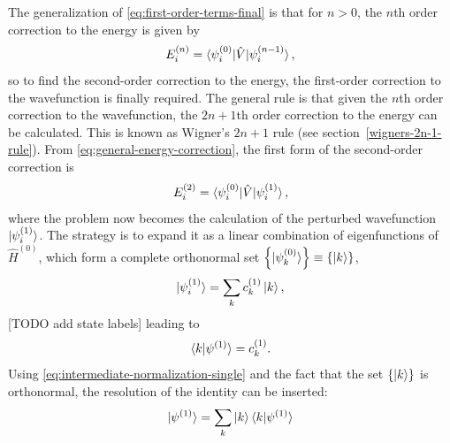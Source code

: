 \documentclass[%
class = book,%
crop = false,%
float = true,%
multi = true,%
preview = false,%
]{standalone}
\begin{document}
The generalization of \eqref{eq:first-order-terms-final} is that for \(n > 0\), the \(n\)th order correction to the energy is given by
\begin{equation}
  \label{eq:general-energy-correction}
  E_{i}^{(n)} = \braket{\psi_{i}^{(0)}|\hat{V}|\psi_{i}^{(n-1)}},
\end{equation}
so to find the second-order correction to the energy, the first-order correction to the wavefunction is finally required. The general rule is that given the \(n\)th order correction to the wavefunction, the \(2n+1\)th order correction to the energy can be calculated. This is known as Wigner's \(2n+1\) rule (see section~\ref{wigners-2n-1-rule}). From \eqref{eq:general-energy-correction}, the first form of the second-order correction is
\begin{equation}
  \label{eq:second-order-correction-first-form}
  E_{i}^{(2)} = \braket{\psi_{i}^{(0)}|\hat{V}|\psi_{i}^{(1)}},
\end{equation}
where the problem now becomes the calculation of the perturbed wavefunction \(\ket{\psi_{i}^{(1)}}\). The strategy is to expand it as a linear combination of eigenfunctions of \(\hat{H}^{(0)}\), which form a complete orthonormal set \(\left\{\ket{\psi_{k}^{(0)}}\right\} \equiv \left\{\ket{k}\right\}\),
\begin{equation}
  \label{eq:orthonormal-eigenfunction-expansion}
  \ket{\psi_{i}^{(1)}} = \sum_{k} c_{k}^{(1)} \ket{k},
\end{equation}
[TODO add state labels] leading to
\begin{equation}
  \label{eq:coefficient-selection}
  \braket{k|\psi^{(1)}} = c_{k}^{(1)}.
\end{equation}
Using \eqref{eq:intermediate-normalization-single} and the fact that the set \(\{\ket{k}\}\) is orthonormal, the resolution of the identity can be inserted:
\begin{equation}
  \label{eq:resolution-of-the-identity}
  \ket{\psi^{(1)}} = \sum_{k} \ket{k} \braket{k|\psi^{(1)}}
\end{equation}
\end{document}
